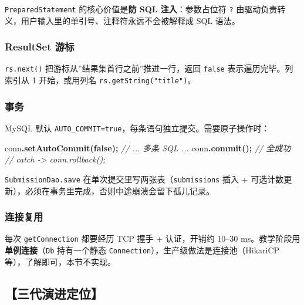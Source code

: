 \documentclass[
  11pt,
]{ctexart}
\newenvironment{Shaded}{\begin{snugshade}}{\end{snugshade}}
\newcommand{\CommentTok}[1]{\textcolor[rgb]{0.56,0.35,0.01}{\textit{#1}}}
\newcommand{\FunctionTok}[1]{\textcolor[rgb]{0.13,0.29,0.53}{\textbf{#1}}}
\newcommand{\KeywordTok}[1]{\textcolor[rgb]{0.13,0.29,0.53}{\textbf{#1}}}
\newcommand{\NormalTok}[1]{#1}
\newcommand{\OperatorTok}[1]{\textcolor[rgb]{0.81,0.36,0.00}{\textbf{#1}}}
\begin{document}
\texttt{PreparedStatement} 的核心价值是\textbf{防 SQL 注入}：参数占位符
\texttt{?} 由驱动负责转义，用户输入里的单引号、注释符永远不会被解释成
SQL 语法。

\hypertarget{resultset-ux6e38ux6807}{%
\subsubsection{ResultSet 游标}\label{resultset-ux6e38ux6807}}

\texttt{rs.next()} 把游标从''结果集首行之前''推进一行，返回
\texttt{false} 表示遍历完毕。列索引从 1 开始，或用列名
\texttt{rs.getString("title")}。

\hypertarget{ux4e8bux52a1}{%
\subsubsection{事务}\label{ux4e8bux52a1}}

MySQL 默认
\texttt{AUTO\_COMMIT=true}，每条语句独立提交。需要原子操作时：

\begin{Shaded}
\begin{Highlighting}[]
\NormalTok{conn}\OperatorTok{.}\FunctionTok{setAutoCommit}\OperatorTok{(}\KeywordTok{false}\OperatorTok{);}
\CommentTok{// ... 多条 SQL ...}
\NormalTok{conn}\OperatorTok{.}\FunctionTok{commit}\OperatorTok{();}          \CommentTok{// 全成功}
\CommentTok{// catch {-}\textgreater{} conn.rollback();}
\end{Highlighting}
\end{Shaded}

\texttt{SubmissionDao.save} 在单次提交里写两张表（\texttt{submissions}
插入 + 可选计数更新），必须在事务里完成，否则中途崩溃会留下孤儿记录。

\hypertarget{ux8fdeux63a5ux590dux7528}{%
\subsubsection{连接复用}\label{ux8fdeux63a5ux590dux7528}}

每次 \texttt{getConnection} 都要经历 TCP 握手 + 认证，开销约 10--30
ms。教学阶段用\textbf{单例连接}（\texttt{Db} 持有一个静态
\texttt{Connection}），生产级做法是连接池（HikariCP
等），了解即可，本节不实现。

\hypertarget{ux4e09ux4ee3ux6f14ux8fdbux5b9aux4f4d-2}{%
\subsection{【三代演进定位】}\label{ux4e09ux4ee3ux6f14ux8fdbux5b9aux4f4d-2}}
\end{document}
